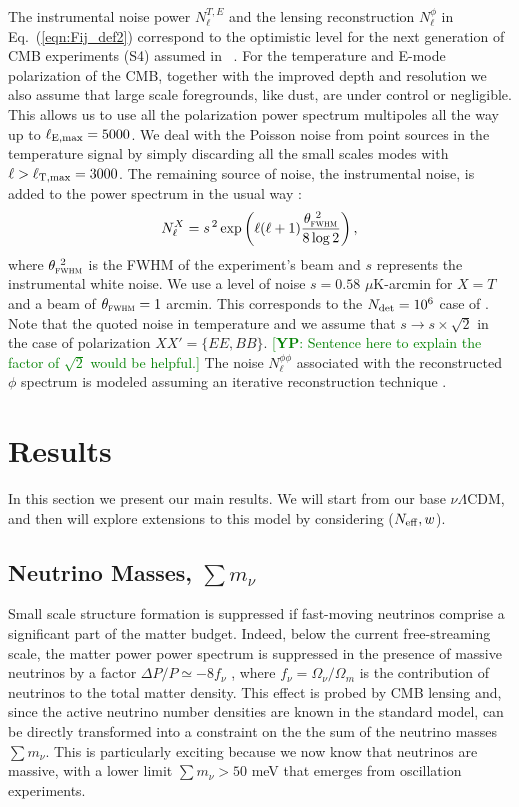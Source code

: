 \documentclass[aps,prd,reprint,superscriptaddress]{revtex4-1}
\newcommand{\yp}[1]{\textcolor{green}{[{\bf YP}: #1]}}
\newcommand\refeq[1]{Eq.~(\ref{eqn:#1})}
\begin{document}
The instrumental noise power $N_{\ell}^{T,E}$ and the lensing reconstruction $N_{\ell}^{\phi}$ in \refeq{Fij_def2} correspond to the optimistic level for the next generation of CMB experiments (S4) assumed in ~\cite{2013arXiv1309.5383A,wu:2014,2013PhRvD..87h3008H}.
For the temperature and E-mode polarization of the CMB, together with the improved depth and resolution we also assume that large scale foregrounds, like dust, are under control or negligible. This allows us to use all the polarization power spectrum multipoles all the way up to $\ell_{\rm E,max}=5000$. We deal with the Poisson noise from point sources in the temperature signal by simply discarding all the small scales modes with $\ell>\ell_{\rm T,max}=3000$.
The remaining source of noise, the instrumental noise, is added to the power spectrum in the usual way \cite{knox:1995}:
 \begin{equation}
 	\centering
		N^{X}_\ell = s^{\, 2} \exp \left(\ell(\ell+1) \frac{\theta^{\ 2}_{\textsc{fwhm}}}{8\log2}\right),
	\label{eq:beamnoise}
\end{equation}
where $\theta^{\ 2}_{\textsc{fwhm}}$ is the FWHM of the experiment's beam and $s$ represents the instrumental white noise.
We use a level of noise $s = 0.58$ $\mu$K-arcmin for $X=T$ and a beam of $\theta_{\textsc{fwhm}}=1$ arcmin. This corresponds to the $N_{\rm det}=10^{6}$ case of \cite{wu:2014}. 
Note that the quoted noise in temperature and we assume that $s \rightarrow s\times \sqrt{2}$ in the case of polarization $ XX' = \{ EE, BB \}$. \yp{Sentence here to explain the factor of $\sqrt{2}$ would be helpful.}
The noise $N_\ell^{\phi\phi}$ associated with the reconstructed $\phi$ spectrum is modeled assuming an iterative reconstruction technique \cite{seljak:2004}. 


\section{Results \label{sec:results}}
In this section we present our main results. We will start from our base $\nu \Lambda$CDM, and then will explore extensions to this model by considering ($N_{\rm eff},w$).

\subsection{Neutrino Masses, $\sum m_\nu$}



Small scale structure formation is suppressed if fast-moving neutrinos comprise a significant part of the matter budget. 
Indeed, below the current free-streaming scale, the matter power power spectrum is suppressed in the presence of
massive neutrinos by a factor $\Delta P/P\simeq -8f_{\nu}$ , where $f_{\nu} = \Omega_{\nu} / \Omega_{m}$ is the contribution of neutrinos to the total matter density.
This effect is probed by CMB lensing and, since the active neutrino number densities are known in the standard model, can be directly transformed into a constraint on the the sum of the neutrino masses $\sum m_\nu$. This is particularly exciting because we now know that neutrinos are massive, with a lower limit  $\sum m_\nu>50$ meV that emerges from oscillation experiments. 
\end{document}
